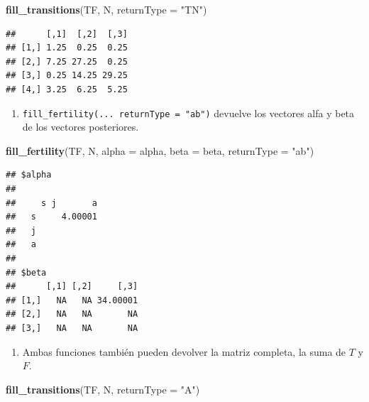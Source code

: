 \documentclass[
]{book}
\newenvironment{Shaded}{\begin{snugshade}}{\end{snugshade}}
\newcommand{\AttributeTok}[1]{\textcolor[rgb]{0.13,0.29,0.53}{#1}}
\newcommand{\FunctionTok}[1]{\textcolor[rgb]{0.13,0.29,0.53}{\textbf{#1}}}
\newcommand{\NormalTok}[1]{#1}
\newcommand{\StringTok}[1]{\textcolor[rgb]{0.31,0.60,0.02}{#1}}
\providecommand{\tightlist}{%
  \setlength{\itemsep}{0pt}\setlength{\parskip}{0pt}}
\theoremstyle{definition}
\theoremstyle{definition}
\theoremstyle{definition}
\theoremstyle{definition}
\theoremstyle{remark}
\begin{document}
\begin{Shaded}
\begin{Highlighting}[]
\FunctionTok{fill\_transitions}\NormalTok{(TF, N, }\AttributeTok{returnType =} \StringTok{"TN"}\NormalTok{)}
\end{Highlighting}
\end{Shaded}

\begin{verbatim}
##      [,1]  [,2]  [,3]
## [1,] 1.25  0.25  0.25
## [2,] 7.25 27.25  0.25
## [3,] 0.25 14.25 29.25
## [4,] 3.25  6.25  5.25
\end{verbatim}

\begin{enumerate}
\def\labelenumi{\arabic{enumi}.}
\setcounter{enumi}{1}
\tightlist
\item
  \texttt{fill\_fertility(...\ returnType\ =\ "ab")} devuelve los vectores alfa y
  beta de los vectores posteriores.\\
\end{enumerate}

\begin{Shaded}
\begin{Highlighting}[]
\FunctionTok{fill\_fertility}\NormalTok{(TF, N, }
               \AttributeTok{alpha =}\NormalTok{ alpha,}
               \AttributeTok{beta =}\NormalTok{ beta,}
               \AttributeTok{returnType =} \StringTok{"ab"}\NormalTok{)}
\end{Highlighting}
\end{Shaded}

\begin{verbatim}
## $alpha
##    
##     s j       a
##   s     4.00001
##   j            
##   a            
## 
## $beta
##      [,1] [,2]     [,3]
## [1,]   NA   NA 34.00001
## [2,]   NA   NA       NA
## [3,]   NA   NA       NA
\end{verbatim}

\begin{enumerate}
\def\labelenumi{\arabic{enumi}.}
\setcounter{enumi}{2}
\tightlist
\item
  Ambas funciones también pueden devolver la matriz completa, la suma
  de \(T\) y \(F\).
\end{enumerate}

\begin{Shaded}
\begin{Highlighting}[]
\FunctionTok{fill\_transitions}\NormalTok{(TF, N, }\AttributeTok{returnType =} \StringTok{"A"}\NormalTok{)}
\end{Highlighting}
\end{Shaded}
\end{document}
